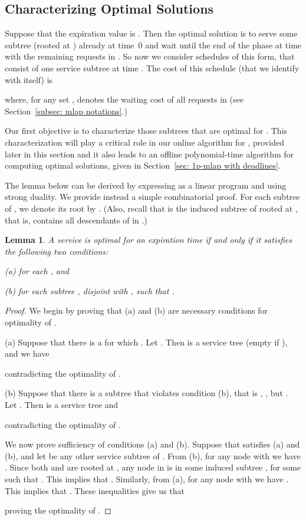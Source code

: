 \documentclass[a4paper]{article}
\newtheorem{lemma}[theorem]{Lemma}
\begin{document}
\subsection{Characterizing Optimal Solutions}

Suppose that the expiration value is . Then the optimal solution is to serve some
subtree  (rooted at ) already at time~0 and wait until the end of the phase at time  with the remaining 
requests in . 
So now we consider schedules of this form, that consist of one 
service subtree  at time .
The cost of this schedule (that we identify with  itself) is

where, for any set , 
denotes the waiting cost of all requests in  (see Section~\ref{subsec: mlap notations}.)

Our first objective
is to characterize those subtrees  that are optimal for . 
This characterization will play a critical role in our online algorithm for
, provided later in this section
and it also leads to an offline polynomial-time algorithm for computing optimal
solutions, given in Section~\ref{sec: 1p-mlap with deadlines}.

The lemma below 
can be derived by expressing  as a linear program and using strong duality. We
provide instead a simple combinatorial proof. For each subtree  of , we
denote its root by . (Also, recall that  is the induced
subtree of  rooted at , that is,  contains all descendants of  in .)


\begin{lemma}\label{lem: 1-phase optimal schedules}
A service  is optimal for an expiration time  if and only if 
it satisfies the following two conditions:
\begin{description}
\item{{\rm (a)}}  for each , and
\item{{\rm (b)}}  for each subtree , disjoint with ,
			such that  .
\end{description}
\end{lemma}

\begin{proof}

We begin by proving that (a) and (b) are necessary conditions for optimality
of .

(a) Suppose that there is a  for which .
Let . Then  is a service tree (empty if ), and we have

contradicting the optimality of .

(b) Suppose that there is a subtree  that violates condition (b), that is ,
, but .
Let . Then  is a service tree and

contradicting the optimality of .


We now prove sufficiency of conditions (a) and (b). Suppose that  satisfies
(a) and (b), and let  be any other service subtree of .
From (b), for any node  with 
we have . 
Since both  and  are rooted at , any node in 
is in some induced subtree , for some  such that .
This implies that .
Similarly, from (a), for any node  with 
we have . This implies that
. These inequalities  give us that

proving the optimality of .
\end{proof}
\end{document}
